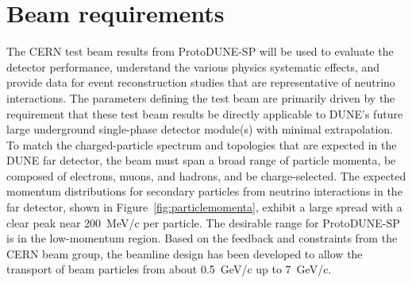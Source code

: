 \section{Beam requirements}
\label{sec:beamrequirements}


The CERN test beam results from ProtoDUNE-SP will be used to evaluate the detector performance,  understand the various physics systematic effects, and provide data for event reconstruction studies that are representative of neutrino interactions. 
The parameters defining the test beam are primarily driven by the requirement that these test beam results be directly applicable to DUNE's future large underground single-phase detector module(s) with minimal extrapolation.
To match the charged-particle spectrum and topologies that are expected in the DUNE far detector, the beam must span a broad range of particle momenta, be composed of electrons, muons, and hadrons, and be charge-selected.  
The expected momentum distributions for secondary particles from neutrino interactions in the far detector, shown in Figure~\ref{fig:particlemomenta}, exhibit a large spread with a clear peak near 200~MeV/c per particle. 
The desirable range for ProtoDUNE-SP is in the low-momentum region. Based on the feedback and constraints from the CERN beam group, the beamline design has been developed to allow the transport of beam particles from about 0.5~GeV/c up to 7~GeV/c. 


